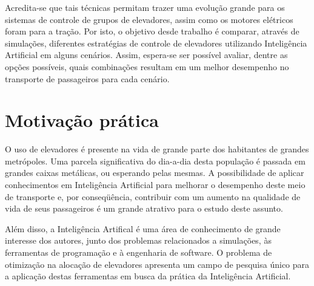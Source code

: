 Acredita-se que tais técnicas permitam trazer uma evolução grande para os
sistemas de controle de grupos de elevadores, assim como os motores elétricos
foram para a tração. Por isto, o objetivo desde trabalho é comparar, através de
simulações, diferentes estratégias de controle de elevadores utilizando
Inteligência Artificial em alguns cenários. Assim, espera-se ser possível
avaliar, dentre as opções possíveis, quais combinações resultam em um melhor
desempenho no transporte de passageiros para cada cenário.

\section{\label{section:motivation}Motivação prática}

O uso de elevadores é presente na vida de grande parte dos habitantes de grandes
metrópoles. Uma parcela significativa do dia-a-dia desta população é passada em
grandes caixas metálicas, ou esperando pelas mesmas. A possibilidade de aplicar
conhecimentos em Inteligência Artificial para melhorar o desempenho deste meio
de transporte e, por conseqüência, contribuir com um aumento na qualidade de
vida de seus passageiros é um grande atrativo para o estudo deste assunto.

Além disso, a Inteligência Artifical é uma área de conhecimento de grande
interesse dos autores, junto dos problemas relacionados a simulações, às
ferramentas de programação e à engenharia de software. O problema de otimização
na alocação de elevadores apresenta um campo de pesquisa único para a aplicação
destas ferramentas em busca da prática da Inteligência Artificial.
